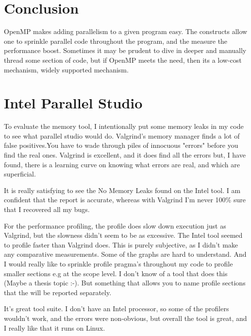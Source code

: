 \documentclass[journal,10pt,draftcls]{IEEEtran}
\begin{document}
\section{Conclusion}
OpenMP makes adding parallelism to a given program easy. The constructs allow one to sprinkle
parallel code throughout the program, and the measure the performance boost. Sometimes it
may be prudent to dive in deeper and manually thread some section of code, but if OpenMP
meets the need, then its a low-cost mechanism, widely supported mechanism.



\appendices
\section{Intel Parallel Studio}
To evaluate the memory tool, I intentionally put some memory leaks in my code 
to see what parallel studio would do.  Valgrind's memory manager finds a lot of 
false positives.You have to wade through piles of innocuous "errors" before you 
find the real ones. Valgrind is excellent, and it does find all the errors but, 
I have found, there is a learning curve on knowing what errors are real, and 
which are superficial. 

It is really satisfying to see the No Memory Leaks found on the Intel tool. I am 
confident that the report is accurate, whereas with Valgrind I'm never 100\% sure that I recovered all my bugs.

For the performance profiling, the profile does slow down execution just as 
Valgrind, but the slowness didn't seem to be as excessive.  The Intel tool 
seemed to profile faster than Valgrind does.  This is purely subjective, as 
I didn't make any comparative measurements.  Some of the graphs are hard to 
understand. And I would really like to sprinkle profile pragma's throughout my 
code to profile smaller sections e.g at the scope level. I don't know of a tool 
that does this (Maybe a thesis topic :-).  But something that allows you to name 
profile sections that the will be reported separately.  

It's great tool suite. I don't have an Intel processor, so some of the profilers 
wouldn't work, and the errors were non-obvious, but overall the tool is great, and 
I really like that it runs on Linux.

\end{document}
